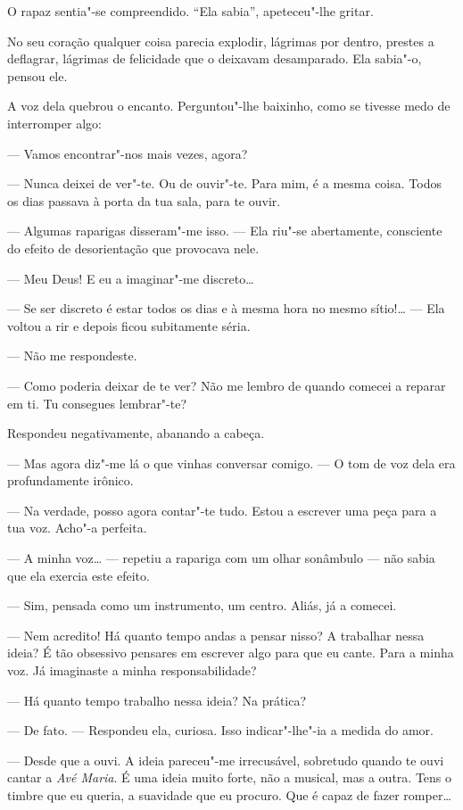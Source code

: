 O rapaz sentia"-se compreendido. ``Ela sabia'', apeteceu"-lhe gritar.

No seu coração qualquer coisa parecia explodir, lágrimas por dentro,
prestes a deflagrar, lágrimas de felicidade que o deixavam desamparado.
Ela sabia"-o, pensou ele.

A voz dela quebrou o encanto. Perguntou"-lhe baixinho, como se tivesse
medo de interromper algo:

--- Vamos encontrar"-nos mais vezes, agora?

--- Nunca deixei de ver"-te. Ou de ouvir"-te. Para mim, é a mesma coisa.
Todos os dias passava à porta da tua sala, para te ouvir.

--- Algumas raparigas disseram"-me isso. --- Ela riu"-se abertamente,
consciente do efeito de desorientação que provocava nele.

--- Meu Deus! E eu a imaginar"-me discreto\ldots{}

--- Se ser discreto é estar todos os dias e à mesma hora no mesmo
sítio!\ldots{} --- Ela voltou a rir e depois ficou subitamente séria.

--- Não me respondeste.

--- Como poderia deixar de te ver? Não me lembro de quando comecei a
reparar em ti. Tu consegues lembrar"-te?

Respondeu negativamente, abanando a cabeça.

--- Mas agora diz"-me lá o que vinhas conversar comigo. --- O tom de voz dela
era profundamente irônico.

--- Na verdade, posso agora contar"-te tudo. Estou a escrever uma peça para
a tua voz. Acho"-a perfeita.

--- A minha voz\ldots{} --- repetiu a rapariga com um olhar sonâmbulo --- não sabia
que ela exercia este efeito.

--- Sim, pensada como um instrumento, um centro. Aliás, já a comecei.

--- Nem acredito! Há quanto tempo andas a pensar nisso? A trabalhar nessa
ideia? É tão obsessivo pensares em escrever algo para que eu cante. Para
a minha voz. Já imaginaste a minha responsabilidade?

--- Há quanto tempo trabalho nessa ideia? Na prática?

--- De fato. --- Respondeu ela, curiosa. Isso indicar"-lhe"-ia a medida do
amor.

--- Desde que a ouvi. A ideia pareceu"-me irrecusável, sobretudo quando te
ouvi cantar a \emph{Avé Maria}. É uma ideia muito forte, não a musical,
mas a outra. Tens o timbre que eu queria, a suavidade que eu procuro.
Que é capaz de fazer romper\ldots{}

